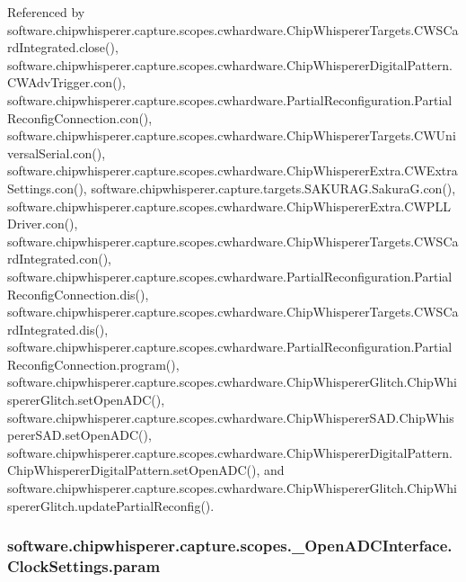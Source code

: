 Referenced by software.\+chipwhisperer.\+capture.\+scopes.\+cwhardware.\+Chip\+Whisperer\+Targets.\+C\+W\+S\+Card\+Integrated.\+close(), software.\+chipwhisperer.\+capture.\+scopes.\+cwhardware.\+Chip\+Whisperer\+Digital\+Pattern.\+C\+W\+Adv\+Trigger.\+con(), software.\+chipwhisperer.\+capture.\+scopes.\+cwhardware.\+Partial\+Reconfiguration.\+Partial\+Reconfig\+Connection.\+con(), software.\+chipwhisperer.\+capture.\+scopes.\+cwhardware.\+Chip\+Whisperer\+Targets.\+C\+W\+Universal\+Serial.\+con(), software.\+chipwhisperer.\+capture.\+scopes.\+cwhardware.\+Chip\+Whisperer\+Extra.\+C\+W\+Extra\+Settings.\+con(), software.\+chipwhisperer.\+capture.\+targets.\+S\+A\+K\+U\+R\+A\+G.\+Sakura\+G.\+con(), software.\+chipwhisperer.\+capture.\+scopes.\+cwhardware.\+Chip\+Whisperer\+Extra.\+C\+W\+P\+L\+L\+Driver.\+con(), software.\+chipwhisperer.\+capture.\+scopes.\+cwhardware.\+Chip\+Whisperer\+Targets.\+C\+W\+S\+Card\+Integrated.\+con(), software.\+chipwhisperer.\+capture.\+scopes.\+cwhardware.\+Partial\+Reconfiguration.\+Partial\+Reconfig\+Connection.\+dis(), software.\+chipwhisperer.\+capture.\+scopes.\+cwhardware.\+Chip\+Whisperer\+Targets.\+C\+W\+S\+Card\+Integrated.\+dis(), software.\+chipwhisperer.\+capture.\+scopes.\+cwhardware.\+Partial\+Reconfiguration.\+Partial\+Reconfig\+Connection.\+program(), software.\+chipwhisperer.\+capture.\+scopes.\+cwhardware.\+Chip\+Whisperer\+Glitch.\+Chip\+Whisperer\+Glitch.\+set\+Open\+A\+D\+C(), software.\+chipwhisperer.\+capture.\+scopes.\+cwhardware.\+Chip\+Whisperer\+S\+A\+D.\+Chip\+Whisperer\+S\+A\+D.\+set\+Open\+A\+D\+C(), software.\+chipwhisperer.\+capture.\+scopes.\+cwhardware.\+Chip\+Whisperer\+Digital\+Pattern.\+Chip\+Whisperer\+Digital\+Pattern.\+set\+Open\+A\+D\+C(), and software.\+chipwhisperer.\+capture.\+scopes.\+cwhardware.\+Chip\+Whisperer\+Glitch.\+Chip\+Whisperer\+Glitch.\+update\+Partial\+Reconfig().

\hypertarget{classsoftware_1_1chipwhisperer_1_1capture_1_1scopes_1_1__OpenADCInterface_1_1ClockSettings_a8d906833259d8a68d7a464e6f9a9f8f0}{}
\subsubsection[{param}]{\setlength{\rightskip}{0pt plus 5cm}software.\+chipwhisperer.\+capture.\+scopes.\+\_\+\+Open\+A\+D\+C\+Interface.\+Clock\+Settings.\+param}\label{classsoftware_1_1chipwhisperer_1_1capture_1_1scopes_1_1__OpenADCInterface_1_1ClockSettings_a8d906833259d8a68d7a464e6f9a9f8f0}


